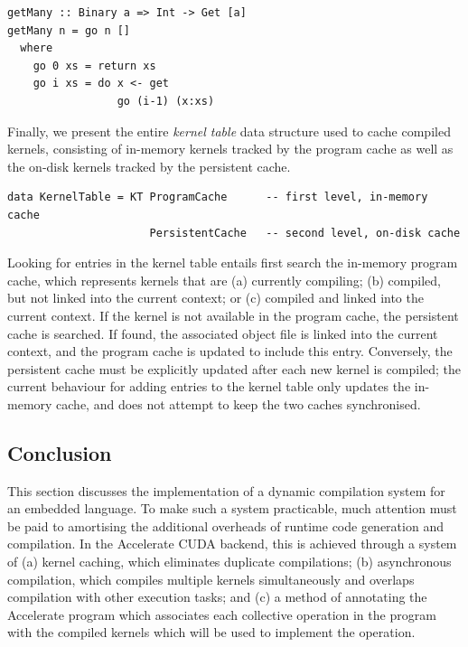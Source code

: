 \begin{lstlisting}[style=haskell]
getMany :: Binary a => Int -> Get [a]
getMany n = go n []
  where
    go 0 xs = return xs
    go i xs = do x <- get
                 go (i-1) (x:xs)
\end{lstlisting}

Finally, we present the entire \emph{kernel table} data structure used to cache
compiled kernels, consisting of in-memory kernels tracked by the program cache
as well as the on-disk kernels tracked by the persistent cache.

\begin{lstlisting}[style=haskell]
data KernelTable = KT ProgramCache      -- first level, in-memory cache
                      PersistentCache   -- second level, on-disk cache
\end{lstlisting}

Looking for entries in the kernel table entails first search the in-memory
program cache, which represents kernels that are (a) currently compiling; (b)
compiled, but not linked into the current context; or (c) compiled and linked
into the current context. If the kernel is not available in the program cache,
the persistent cache is searched. If found, the associated object file is linked
into the current context, and the program cache is updated to include this
entry. Conversely, the persistent cache must be explicitly updated after each
new kernel is compiled; the current behaviour for adding entries to the kernel
table only updates the in-memory cache, and does not attempt to keep the two
caches synchronised.


\subsection{Conclusion}

This section discusses the implementation of a dynamic compilation system for an
embedded language. To make such a system practicable, much attention must be
paid to amortising the additional overheads of runtime code generation and
compilation. In the Accelerate CUDA backend, this is achieved through a system
of (a) kernel caching, which eliminates duplicate compilations; (b) asynchronous
compilation, which compiles multiple kernels simultaneously and overlaps
compilation with other execution tasks; and (c) a method of annotating the
Accelerate program which associates each collective operation in the program
with the compiled kernels which will be used to implement the operation.



